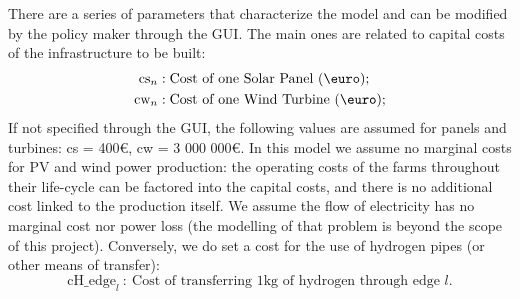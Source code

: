 \documentclass[english]{article}
\numberwithin{definition}{section}
\numberwithin{theorem}{section}
\numberwithin{problem}{section}
\begin{document}
There are a series of parameters that characterize the model and can be modified by the policy maker through the GUI. The main ones are related to capital costs of the infrastructure to be built:
\begin{align*}
    \text{cs}_n & : \text{Cost of one Solar Panel (\euro);} \\
    \text{cw}_n & : \text{Cost of one Wind Turbine (\euro)}; 
\end{align*} %
If not specified through the GUI, the following values are assumed for panels and turbines: cs = 400\euro, cw = 3 000 000\euro. In this model we assume no marginal costs for PV and wind power production: the operating costs of the farms throughout their life-cycle can be factored into the capital costs, and there is no additional cost linked to the production itself. 
We assume the flow of electricity has no marginal cost nor power loss (the modelling of that problem is beyond the scope of this project). Conversely, we do set a cost for the use of hydrogen pipes (or other means of transfer):
\[
\text{cH\_edge}_l\ :\ \text{Cost of transferring 1kg of hydrogen through edge $l$}.
\]
\end{document}
